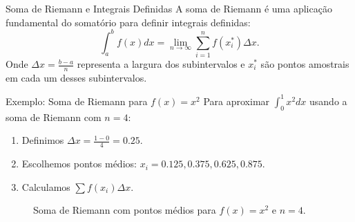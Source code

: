 \documentclass{beamer}
\begin{document}
\begin{frame}{Soma de Riemann e Integrais Definidas}
    A soma de Riemann é uma aplicação fundamental do somatório para definir integrais definidas:
    \[
        \int_{a}^{b} f(x) dx = \lim_{n \to \infty} \sum_{i=1}^{n} f(x_i^*) \Delta x.
    \]
    Onde \( \Delta x = \displaystyle \frac{b-a}{n} \) representa a largura dos subintervalos e $x_i^*$ são pontos amostrais em cada um desses subintervalos.
\end{frame}

\begin{frame}{Exemplo: Soma de Riemann para \( f(x) = x^2 \)}
    Para aproximar \( \int_{0}^{1} x^2 dx \) usando a soma de Riemann com \( n=4 \):
    \begin{enumerate}
        \item Definimos \( \Delta x = \displaystyle \frac{1-0}{4} = 0.25 \).
        \item Escolhemos pontos médios: \( x_i = 0.125, 0.375, 0.625, 0.875 \).
        \item Calculamos \( \sum f(x_i) \Delta x \).
    \end{enumerate}

    \begin{figure}[h]
    \centering
    \caption{Soma de Riemann com pontos médios para \( f(x) = x^2 \) e \( n=4 \).}
\end{figure}

\end{frame}
\end{document}
